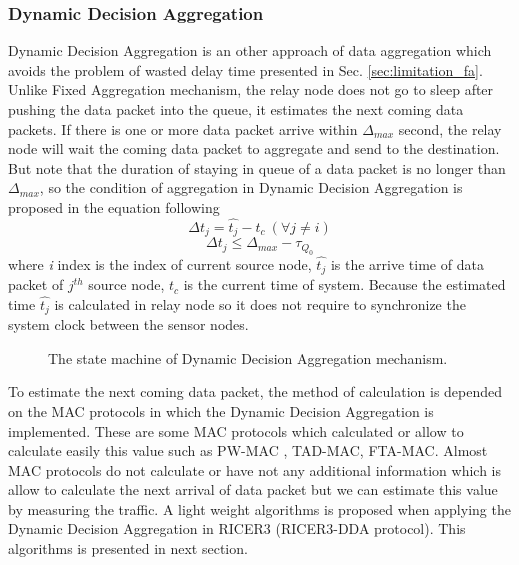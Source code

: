 \subsubsection{Dynamic Decision Aggregation}
Dynamic Decision Aggregation is an other approach of data aggregation which avoids the problem of wasted delay time presented in Sec. \ref{sec:limitation_fa}. Unlike Fixed Aggregation mechanism, the relay node does not go to sleep after pushing the data packet into the queue, it estimates the next coming data packets. If there is one or more data packet arrive within $\Delta_{max}$ second, the relay node will wait the coming data packet to aggregate and send to the destination. But note that the duration of staying in queue of a data packet is no longer than $\Delta_{max}$, so the condition of aggregation in Dynamic Decision Aggregation is proposed in the equation following
\begin{equation}
\Delta{t_j} = \widehat{t_j} - t_c\ (\forall{j \neq i})
\label{eq:dda_delta_t_j}
\end{equation}
\begin{equation}
\Delta{t_j} \leq \Delta_{max} - \tau_{Q_0}
\label{eq:dda_condition}
\end{equation}
where \textit{i} index is the index of current source node, $\widehat{t_j}$ is the arrive time of data packet of $j^{th}$ source node, $t_c$ is the current time of system. Because the estimated time $\widehat{t_j}$ is calculated in relay node so it does not require to synchronize the system clock between the sensor nodes.
\begin{figure}[!t]
\begin{center}
\caption{The state machine of Dynamic Decision Aggregation mechanism.}
\label{fig:dda}
\end{center}
\end{figure}

To estimate the next coming data packet, the method of calculation is depended on the MAC protocols in which the Dynamic Decision Aggregation is implemented. These are some MAC protocols which calculated or allow to calculate easily this value such as PW-MAC \cite{pw-mac}, TAD-MAC, FTA-MAC. Almost MAC protocols do not calculate or have not any additional information which is allow to calculate the next arrival of data packet but we can estimate this value by measuring the traffic. A light weight algorithms is proposed when applying the Dynamic Decision Aggregation in RICER3 (RICER3-DDA protocol). This algorithms is presented in next section.

